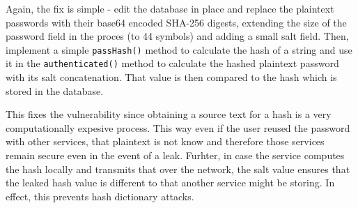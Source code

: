 \documentclass[10pt]{article}
\begin{document}
            Again, the fix is simple - edit the database in place and replace
            the plaintext passwords with their base64 encoded SHA-256 digests,
            extending the size of the password field in the proces (to 44
            symbols) and adding a small salt field. Then, implement a simple
            \texttt{passHash()} method to calculate the hash of a string and
            use it in the \texttt{authenticated()} method to calculate the
            hashed plaintext password with its salt concatenation. That value
            is then compared to the hash which is stored in the database.

            This fixes the vulnerability since obtaining a source text for a
            hash is a very computationally expesive process. This way even if
            the user reused the password with other services, that plaintext is
            not know and therefore those services remain secure even in the
            event of a leak. Furhter, in case the service computes the hash
            locally and transmits that over the network, the salt value ensures
            that the leaked hash value is different to that another service
            might be storing. In effect, this prevents hash dictionary attacks.
\end{document}

